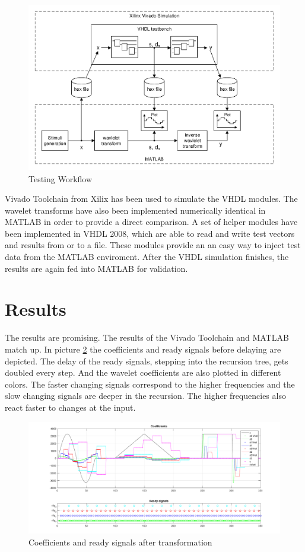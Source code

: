 \begin{refsection}
\begin{figure}
	\centering
	\includegraphics[width=\textwidth]{papers/fpga/images/vhdl_sim.pdf}
	\caption{Testing Workflow \label{fpga:fig:testing}}
\end{figure}

Vivado Toolchain from Xilix has been used to simulate the VHDL modules.
The wavelet transforms have also been implemented numerically identical in MATLAB in order to provide a direct comparison. 
A set of helper modules have been implemented in VHDL 2008, which are able to read and write test vectors and results from or to a file.
These modules provide an an easy way to inject test data from the MATLAB enviroment.
After the VHDL simulation finishes, the results are again fed into MATLAB for validation.

\section{Results}

The results are promising. The results of the Vivado Toolchain and MATLAB match up. 
In picture \ref{fpga:fig:coeff} the coefficients and ready signals before delaying are depicted.
The delay of the ready signals, stepping into the recursion tree, gets doubled every step. 
And the wavelet coefficients are also plotted in different colors. 
The faster changing signals correspond to the higher frequencies and the slow changing signals are deeper in the recursion.
The higher frequencies also react faster to changes at the input.
\begin{figure}
	\centering
	\includegraphics[width=\textwidth]{papers/fpga/images/coefs.pdf}
	\caption{Coefficients and ready signals after transformation \label{fpga:fig:coeff}}
\end{figure}


\end{refsection}
